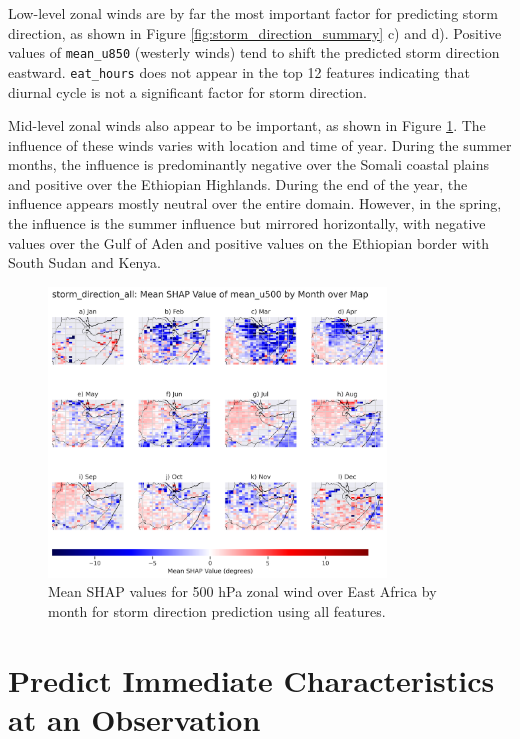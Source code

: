 Low-level zonal winds are by far the most important factor for predicting storm direction, as shown in Figure \ref{fig:storm_direction_summary} c) and d). Positive values of \texttt{mean\_u850} (westerly winds) tend to shift the predicted storm direction eastward. \texttt{eat\_hours} does not appear in the top 12 features indicating that diurnal cycle is not a significant factor for storm direction.

Mid-level zonal winds also appear to be important, as shown in Figure \ref{fig:storm_direction_all_shap_mean_u500_map_by_month}. The influence of these winds varies with location and time of year. During the summer months, the influence is predominantly negative over the Somali coastal plains and positive over the Ethiopian Highlands. During the end of the year, the influence appears mostly neutral over the entire domain. However, in the spring, the influence is the summer influence but mirrored horizontally, with negative values over the Gulf of Aden and positive values on the Ethiopian border with South Sudan and Kenya.

\begin{figure}[ht]
    \centering
    \includegraphics[width=0.8\textwidth]{../figures/generated/experiments/storm_direction/geographic_corr/storm_direction_all_shap_mean_u500_map_by_month.png}
    \caption{Mean SHAP values for 500 hPa zonal wind over East Africa by month for storm direction prediction using all features.}
    \label{fig:storm_direction_all_shap_mean_u500_map_by_month}
\end{figure}

\clearpage
\section{Predict Immediate Characteristics at an Observation}

